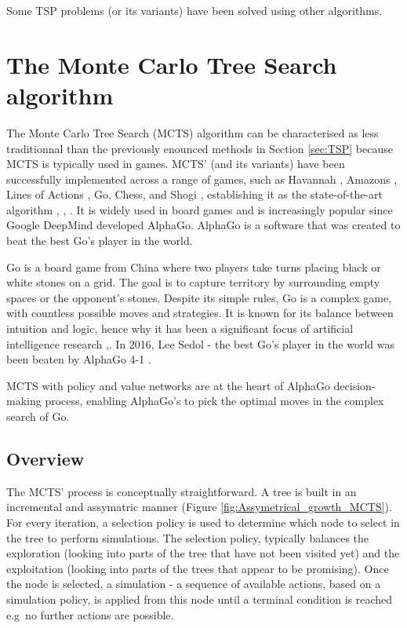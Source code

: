 Some TSP problems (or its variants) have been solved using other algorithms.

\newpage
\section{The Monte Carlo Tree Search algorithm}

The Monte Carlo Tree Search (MCTS) algorithm can be characterised as less traditionnal than the previously enounced methods in Section \ref{sec:TSP} because MCTS is typically used in games. MCTS' (and its variants)
have been successfully implemented across a range of games, such as Havannah \cite{wiki:board_game},  Amazons \cite{wiki:Game_of_the_Amazons}, Lines of Actions \cite{wiki:Lines_of_Action}, Go, Chess, and Shogi \cite{wiki:Shogi}, establishing it as the state-of-the-art algorithm \cite{havannah}, \cite{amazons}, \cite{lines_of_actions}. It is widely used in board games and is increasingly popular since Google DeepMind developed AlphaGo. AlphaGo is a software that was created to beat the best Go's player in the world.

Go is a board game from China where two players take turns placing black or white stones on a grid. The goal is to capture territory by surrounding empty spaces or the opponent’s stones. Despite its simple rules, Go is a complex game, with countless possible moves and strategies. It is known for its balance between intuition and logic, hence why it has been a significant focus of artificial intelligence research ,\cite{wiki:Go}. In 2016, Lee Sedol \cite{wiki:Lee_Sedol} - the best Go's player in the world was been beaten by AlphaGo 4-1 \cite{alpha_go_documentary}.

MCTS with policy and value networks are at the heart of AlphaGo decision-making process, enabling AlphaGo's to pick the optimal moves in the complex search of Go. \cite{mcts_alpha_go_algorithm}



\subsection{Overview}
The MCTS' process is conceptually straightforward. A tree is built in an incremental and assymatric manner (Figure \ref{fig:Assymetrical_growth_MCTS}).
For every iteration, a selection policy is used to determine which node to select in the tree to perform simulations.
The selection policy, typically balances the exploration  (looking into parts of the tree that have not been visited yet) and the exploitation (looking into parts of the trees that appear to be promising).
Once the node is selected, a simulation - a sequence of available actions, based on a simulation policy, is applied from this node until a terminal condition is reached e.g\ no further actions are possible. \cite{mcts_various_policies}

